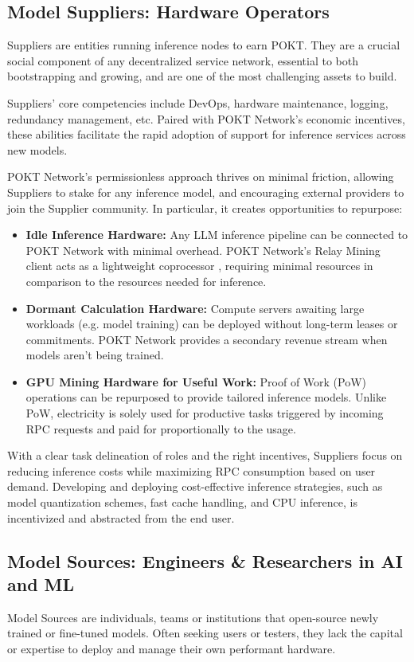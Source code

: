 \documentclass[conference,compsoc]{IEEEtran}
\begin{document}
\subsection{Model Suppliers: Hardware Operators}

Suppliers are entities running inference nodes to earn POKT. They are a crucial social component of any decentralized service network, essential to both bootstrapping and growing, and are one of the most challenging assets to build.

Suppliers' core competencies include DevOps, hardware maintenance, logging, redundancy management, etc. Paired with POKT Network’s economic incentives, these abilities facilitate the rapid adoption of support for inference services across new models.

POKT Network's permissionless approach thrives on minimal friction, allowing Suppliers to stake for any inference model, and encouraging external providers to join the Supplier community. In particular, it creates opportunities to repurpose:

\begin{itemize}
    \item \textbf{Idle Inference Hardware:} Any LLM inference pipeline can be connected to POKT Network with minimal overhead. POKT Network's Relay Mining client acts as a lightweight coprocessor \cite{coprocessor}, requiring minimal resources in comparison to the resources needed for inference.
    \item \textbf{Dormant Calculation Hardware:} Compute servers awaiting large workloads (e.g. model training) can be deployed without long-term leases or commitments. POKT Network provides a secondary revenue stream when models aren't being trained.
    \item \textbf{GPU Mining Hardware for Useful Work:} Proof of Work (PoW) operations can be repurposed to provide tailored inference models. Unlike PoW, electricity is solely used for productive tasks triggered by incoming RPC requests and paid for proportionally to the usage.
\end{itemize}

With a clear task delineation of roles and the right incentives, Suppliers focus on reducing inference costs while maximizing RPC consumption based on user demand. Developing and deploying cost-effective inference strategies, such as model quantization schemes, fast cache handling, and CPU inference, is incentivized and abstracted from the end user.


\subsection{Model Sources: Engineers \& Researchers in AI and ML}
Model Sources are individuals, teams or institutions that open-source newly trained or fine-tuned models. Often seeking users or testers, they lack the capital or expertise to deploy and manage their own performant hardware.
\end{document}

